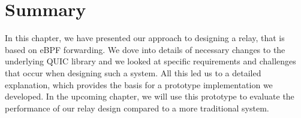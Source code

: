 \section{Summary}\label{sec:summary_ch3}

In this chapter, we have presented our approach to designing a relay, that 
is based on eBPF forwarding.
We dove into details of necessary changes to the underlying QUIC library
and we looked at specific requirements and challenges that occur when
designing such a system. 
All this led us to a detailed explanation, which provides the basis for a 
prototype implementation we developed.
In the upcoming chapter, we will use this prototype to evaluate the 
performance of our relay design compared to a more traditional system.